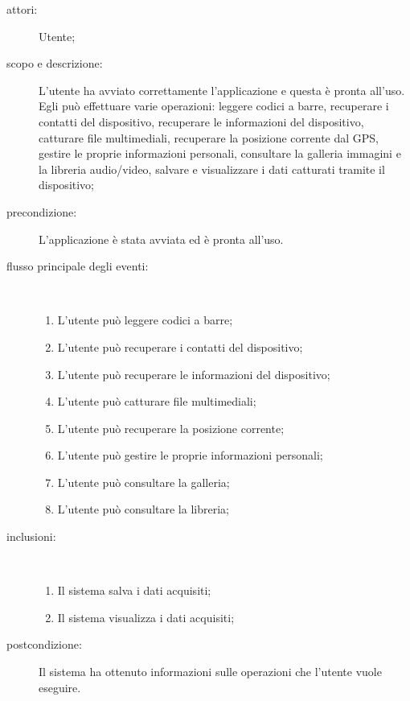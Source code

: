 \begin{description}
\item[attori:] Utente;
\item[scopo e descrizione:] L'utente ha avviato correttamente l'applicazione e questa è pronta all'uso. Egli può effettuare varie operazioni: leggere codici a barre, recuperare i contatti del dispositivo, recuperare le informazioni del dispositivo, catturare file multimediali, recuperare la posizione corrente dal \ac{GPS}, gestire le proprie informazioni personali, consultare la galleria immagini e la libreria audio/video, salvare e visualizzare i dati catturati tramite il dispositivo;
\item[precondizione:] L'applicazione è stata avviata ed è pronta all'uso.
\item[flusso principale degli eventi:] \hfill \\
	\begin{enumerate}
	\item L'utente può leggere codici a barre;
	\item L'utente può recuperare i contatti del dispositivo;
	\item L'utente può recuperare le informazioni del dispositivo;
	\item L'utente può catturare file multimediali;
	\item L'utente può recuperare la posizione corrente;
	\item L'utente può gestire le proprie informazioni personali;
	\item L'utente può consultare la galleria;
	\item L'utente può consultare la libreria;
	\end{enumerate}
\item[inclusioni:] \hfill \\
	\begin{enumerate}
	\item Il sistema salva i dati acquisiti;
	\item Il sistema visualizza i dati acquisiti;
	\end{enumerate}
\item[postcondizione:] Il sistema ha ottenuto informazioni sulle operazioni che l'utente vuole eseguire.
\end{description}

